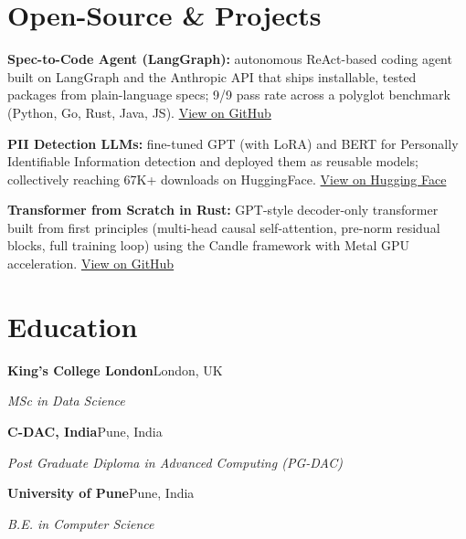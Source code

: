 \documentclass[10pt,a4paper]{article}
\begin{document}
\section{Open-Source \& Projects}
\begin{tight}
  \item \textbf{Spec-to-Code Agent (LangGraph):} autonomous ReAct-based coding agent built on LangGraph and the Anthropic API that ships installable, tested packages from plain-language specs; 9/9 pass rate across a polyglot benchmark (Python, Go, Rust, Java, JS). \href{https://github.com/abhijeetscode/Spec-to-Code-Agent}{View on GitHub}
  \item \textbf{PII Detection LLMs:} fine-tuned GPT (with LoRA) and BERT for Personally Identifiable Information detection and deployed them as reusable models; collectively reaching 67K+ downloads on HuggingFace. \href{https://huggingface.co/ab-ai/pii_model}{View on Hugging Face}
  \item \textbf{Transformer from Scratch in Rust:} GPT-style decoder-only transformer built from first principles (multi-head causal self-attention, pre-norm residual blocks, full training loop) using the Candle framework with Metal GPU acceleration. \href{https://github.com/abhijeetscode/transformer-rust}{View on GitHub}
\end{tight}

\section{Education}
{\color{company}\bfseries King's College London}\hfill {\color{muted}London, UK}\par
{\itshape MSc in Data Science}\par\vspace{2pt}
{\color{company}\bfseries C-DAC, India}\hfill {\color{muted}Pune, India}\par
{\itshape Post Graduate Diploma in Advanced Computing (PG-DAC)}\par\vspace{2pt}
{\color{company}\bfseries University of Pune}\hfill {\color{muted}Pune, India}\par
{\itshape B.E. in Computer Science}\par
\end{document}
